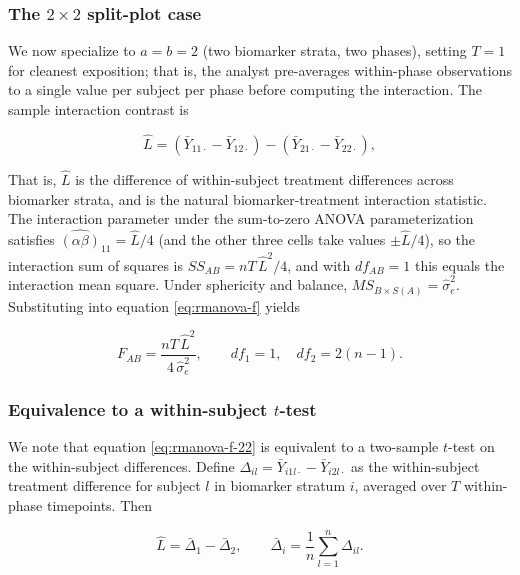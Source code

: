 \documentclass[
  11pt,
]{article}
\begin{document}
\subsubsection{\texorpdfstring{The \(2 \times 2\) split-plot case}{The 2 \textbackslash times 2 split-plot case}}\label{the-2-times-2-split-plot-case}

We now specialize to \(a = b = 2\) (two biomarker strata, two
phases), setting \(T = 1\) for cleanest exposition; that is, the
analyst pre-averages within-phase observations to a single value
per subject per phase before computing the interaction. The
sample interaction contrast is

\begin{equation}
\hat L = (\bar Y_{11\cdot} - \bar Y_{12\cdot})
- (\bar Y_{21\cdot} - \bar Y_{22\cdot}) ,
\label{eq:rmanova-Lhat}
\end{equation}

That is, \(\hat L\) is the difference of within-subject treatment
differences across biomarker strata, and is the natural
biomarker-treatment interaction statistic. The interaction
parameter under the sum-to-zero ANOVA parameterization satisfies
\(\widehat{(\alpha\beta)}_{11} = \hat L / 4\) (and the other three
cells take values \(\pm \hat L / 4\)), so the interaction sum of
squares is \(SS_{AB} = nT\,\hat L^2 / 4\), and with \(df_{AB} = 1\)
this equals the interaction mean square. Under sphericity and
balance, \(MS_{B \times S(A)} = \hat\sigma_e^2\). Substituting
into equation \eqref{eq:rmanova-f} yields

\begin{equation}
F_{AB} = \frac{nT\,\hat L^2}{4\,\hat\sigma_e^2},
\qquad df_1 = 1, \quad df_2 = 2(n-1) .
\label{eq:rmanova-f-22}
\end{equation}

\subsubsection{\texorpdfstring{Equivalence to a within-subject \(t\)-test}{Equivalence to a within-subject t-test}}\label{equivalence-to-a-within-subject-t-test}

We note that equation \eqref{eq:rmanova-f-22} is equivalent to a
two-sample \(t\)-test on the within-subject differences. Define
\(\Delta_{il} = \bar Y_{i1l\cdot} - \bar Y_{i2l\cdot}\) as the
within-subject treatment difference for subject \(l\) in biomarker
stratum \(i\), averaged over \(T\) within-phase timepoints. Then

\begin{equation}
\hat L = \bar\Delta_1 - \bar\Delta_2,
\qquad
\bar\Delta_i = \frac{1}{n}\sum_{l=1}^n \Delta_{il}.
\label{eq:rmanova-Delta}
\end{equation}
\end{document}
